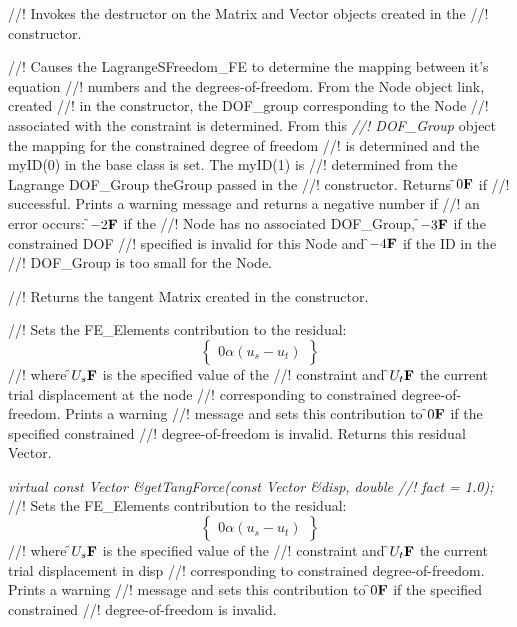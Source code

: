 //! Invokes the destructor on the Matrix and Vector objects created in the
//! constructor.

//! Causes the LagrangeSFreedom\_FE to determine the mapping between it's equation
//! numbers and the degrees-of-freedom. From the Node object link, created
//! in the constructor, the DOF\_group corresponding to the Node
//! associated with the constraint is determined. From this {\em
//! DOF\_Group} object the mapping for the constrained degree of freedom
//! is determined and the myID(0) in the base class is set. The myID(1) is
//! determined from the Lagrange DOF\_Group \p theGroup passed in the
//! constructor. Returns \f$0{\bf F}$ if 
//! successful. Prints a warning message and returns a negative number if
//! an error occurs: \f$-2{\bf F}$ if the
//! Node has no associated DOF\_Group, \f$-3{\bf F}$ if the constrained DOF
//! specified is invalid for this Node and \f$-4{\bf F}$ if the ID in the
//! DOF\_Group is too small for the Node. 

//! Returns the tangent Matrix created in the constructor.

//! Sets the FE\_Elements contribution to the residual:
\[ \left\{ \begin{array}{c} 0 \alpha(u_s - u_t) \end{array} \right\} \]
//! where \f$U_s{\bf F}$ is the specified value of the
//! constraint and \f$U_t{\bf F}$ the current trial displacement at the node
//! corresponding to constrained degree-of-freedom. Prints a warning
//! message and sets this contribution to \f$0{\bf F}$ if the specified constrained
//! degree-of-freedom is invalid. Returns this residual Vector.


{\em virtual const Vector \&getTangForce(const Vector \&disp, double
//! fact = 1.0);    }
//! Sets the FE\_Elements contribution to the residual:
\[ \left\{ \begin{array}{c} 0 \alpha(u_s - u_t) \end{array} \right\} \]
//! where \f$U_s{\bf F}$ is the specified value of the
//! constraint and \f$U_t{\bf F}$ the current trial displacement in \p disp
//! corresponding to constrained degree-of-freedom. Prints a warning
//! message and sets this contribution to \f$0{\bf F}$ if the specified constrained
//! degree-of-freedom is invalid. 










